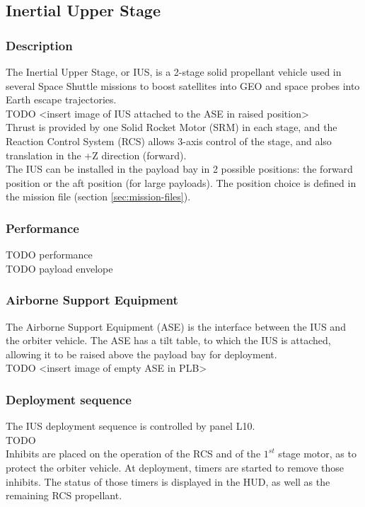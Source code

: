 \documentclass[Space_Shuttle_Ultra_Manual.tex]{subfiles}
\begin{document}
\subsection{Inertial Upper Stage}
\begin{multicols*}{2}
\renewcommand{\cfttoctitlefont}{\bf}
\localtableofcontents
\subsubsection{Description}
\noindent
The Inertial Upper Stage, or IUS, is a 2-stage solid propellant vehicle used in several Space Shuttle missions to boost satellites into GEO and space probes into Earth escape trajectories.
\\
TODO <insert image of IUS attached to the ASE in raised position>
\\
Thrust is provided by one Solid Rocket Motor (SRM) in each stage, and the Reaction Control System (RCS) allows 3-axis control of the stage, and also translation in the +Z direction (forward).
\\
The IUS can be installed in the payload bay in 2 possible positions: the forward position or the aft position (for large payloads). The position choice is defined in the mission file (section \ref{sec:mission-files}).

\subsubsection{Performance}
TODO performance
\\
TODO payload envelope

\subsubsection{Airborne Support Equipment}
The Airborne Support Equipment (ASE) is the interface between the IUS and the orbiter vehicle. The ASE has a tilt table, to which the IUS is attached, allowing it to be raised above the payload bay for deployment.
\\
TODO <insert image of empty ASE in PLB>

\subsubsection{Deployment sequence}
The IUS deployment sequence is controlled by panel L10.
\\
TODO
\\
Inhibits are placed on the operation of the RCS and of the $1^{st}$ stage motor, as to protect the orbiter vehicle. At deployment, timers are started to remove those inhibits. The status of those timers is displayed in the HUD, as well as the remaining RCS propellant.


\end{multicols*}
\end{document}
